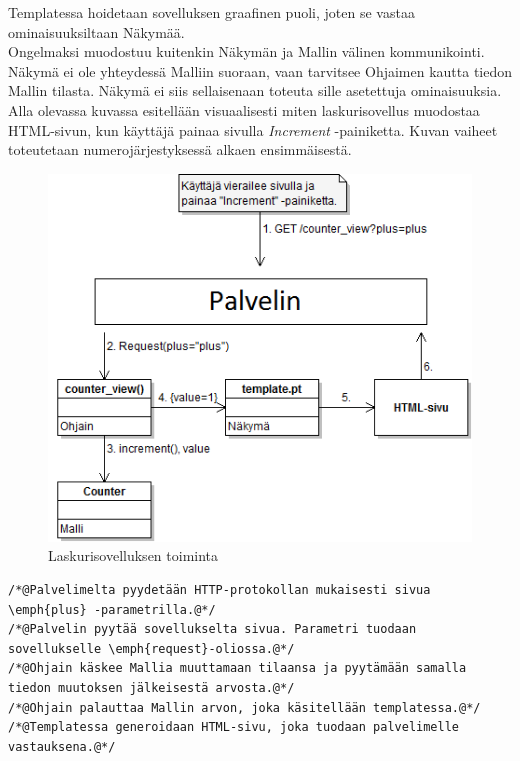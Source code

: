 \documentclass[utf8]{gradu3}
\begin{document}
Templatessa hoidetaan sovelluksen graafinen puoli, joten se vastaa ominaisuuksiltaan Näkymää. \\ Ongelmaksi muodostuu kuitenkin Näkymän ja Mallin välinen kommunikointi. Näkymä ei ole yhteydessä Malliin suoraan, vaan tarvitsee Ohjaimen kautta tiedon Mallin tilasta.  Näkymä ei siis sellaisenaan toteuta sille asetettuja ominaisuuksia. \\

Alla olevassa kuvassa esitellään visuaalisesti miten laskurisovellus muodostaa HTML-sivun, kun käyttäjä painaa sivulla \emph{Increment} -painiketta. Kuvan
vaiheet toteutetaan numerojärjestyksessä alkaen ensimmäisestä.
\begin{figure}[h]
\centering
\includegraphics[scale=0.87]{laskurisovellus.png}
\caption{Laskurisovelluksen toiminta}
\end{figure}

\begin{lstlisting}
/*@Palvelimelta pyydetään HTTP-protokollan mukaisesti sivua \emph{plus} -parametrilla.@*/
/*@Palvelin pyytää sovellukselta sivua. Parametri tuodaan sovellukselle \emph{request}-oliossa.@*/
/*@Ohjain käskee Mallia muuttamaan tilaansa ja pyytämään samalla tiedon muutoksen jälkeisestä arvosta.@*/
/*@Ohjain palauttaa Mallin arvon, joka käsitellään templatessa.@*/
/*@Templatessa generoidaan HTML-sivu, joka tuodaan palvelimelle vastauksena.@*/
\end{lstlisting}
\end{document}
